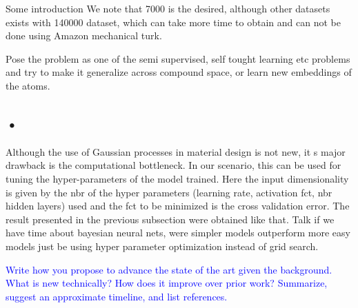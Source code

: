 \documentclass[10pt,journal,a4paper]{IEEEtran}
\begin{document}
Some introduction
 We note that 7000 is the desired, although other datasets exists
 with 140000 dataset, which can take more time to obtain and can not be done using Amazon mechanical turk.
 
Pose the problem as one of the semi supervised, self tought learning etc problems and try to make it generalize across compound space, or learn new embeddings of the atoms.
\subsection*{•}
Although the use of Gaussian processes in material design is not new, it s major drawback is the computational bottleneck. In our scenario, this can be used for
tuning the hyper-parameters of the model trained.
Here the input dimensionality is given by the nbr of the hyper parameters (learning rate, activation fct, nbr hidden layers) used and the fct to be minimized is the cross validation error.
The result presented in the previous subsection were obtained like that.
Talk if we have time about bayesian neural nets, were simpler models outperform more easy models just be using hyper parameter optimization instead of grid search.

 \textcolor{blue}{Write how you
propose to advance the state of the art given the background. What
is new technically? How does it improve over prior work?
Summarize, suggest an approximate timeline, and list references.}

\vspace{1cm}





%
%
%
\end{document}
